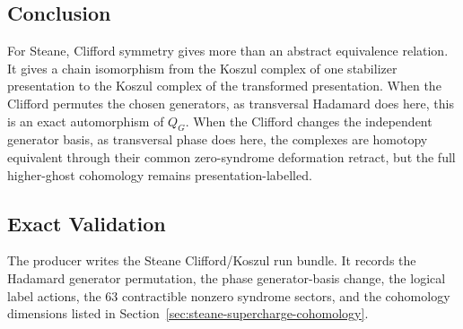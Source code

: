 \subsection{Conclusion}

For Steane, Clifford symmetry gives more than an abstract equivalence relation.
It gives a chain isomorphism from the Koszul complex of one stabilizer
presentation to the Koszul complex of the transformed presentation. When the
Clifford permutes the chosen generators, as transversal Hadamard does here,
this is an exact automorphism of \(Q_G\). When the Clifford changes the
independent generator basis, as transversal phase does here, the complexes are
homotopy equivalent through their common zero-syndrome deformation retract, but
the full higher-ghost cohomology remains presentation-labelled.

\subsection{Exact Validation}

The producer  writes the Steane
Clifford/Koszul run bundle. It records the Hadamard generator permutation, the
phase generator-basis change, the logical label actions, the 63 contractible
nonzero syndrome sectors, and the cohomology dimensions listed in
Section~\ref{sec:steane-supercharge-cohomology}.
